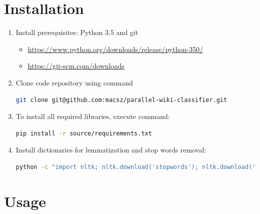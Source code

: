 \section{Installation}
\begin{enumerate}
	\item Install prerequisites: Python 3.5 and git
	\begin{itemize}
		\item \href{https://www.python.org/downloads/release/python-350/}{https://www.python.org/downloads/release/python-350/}
		\item \href{https://git-scm.com/downloads}{https://git-scm.com/downloads}
	\end{itemize}
	\item Clone code repository using command
\begin{lstlisting}[language=Bash, numbers=none]
git clone git@github.com:macsz/parallel-wiki-classifier.git
\end{lstlisting}
	\item To install all required libraries, execute command:
\begin{lstlisting}[language=Bash, numbers=none]
pip install -r source/requirements.txt
\end{lstlisting}
\item Install dictionaries for lemmatization and stop words removal:
\begin{lstlisting}[language=Bash, numbers=none]
python -c "import nltk; nltk.download('stopwords'); nltk.download('wordnet')"
\end{lstlisting}
\end{enumerate}
\section{Usage}

